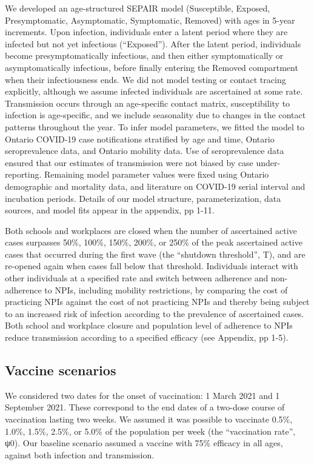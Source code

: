 We developed an age-structured SEPAIR model (Susceptible, Exposed, Presymptomatic, Asymptomatic, Symptomatic, Removed) with ages in 5-year increments. Upon infection, individuals enter a latent period where they are infected but not yet infectious (“Exposed”).  After the latent period, individuals become presymptomatically infectious, and then either symptomatically or asymptomatically infectious, before finally entering the Removed compartment when their infectiousness ends. We did not model testing or contact tracing explicitly, although we assume infected individuals are ascertained at some rate. Transmission occurs through an age-specific contact matrix, susceptibility to infection is age-specific, and we include seasonality due to changes in the contact patterns throughout the year.  To infer model parameters, we fitted the model to Ontario COVID-19 case notifications stratified by age and time, Ontario seroprevalence data, and Ontario mobility data.  Use of seroprevalence data ensured that our estimates of transmission were not biased by case under-reporting. Remaining model parameter values were fixed using Ontario demographic and mortality data, and literature on COVID-19 serial interval and incubation periods.  Details of our model structure, parameterization, data sources, and model fits appear in the appendix, pp 1-11. 

Both schools and workplaces are closed when the number of ascertained active cases surpasses 50\%, 100\%, 150\%, 200\%, or 250\% of the peak ascertained active cases that occurred during the first wave (the “shutdown threshold”, T), and are re-opened again when cases fall below that threshold. Individuals interact with other individuals at a specified rate and switch between adherence and non-adherence to NPIs, including mobility restrictions, by comparing the cost of practicing NPIs against the cost of not practicing NPIs and thereby being subject to an increased risk of infection according to the prevalence of ascertained cases.  Both school and workplace closure and population level of adherence to NPIs reduce transmission according to a specified efficacy (see Appendix, pp 1-5). 

\subsection{Vaccine scenarios} 

We considered two dates for the onset of vaccination: 1 March 2021 and 1 September 2021. These correspond to the end dates of a two-dose course of vaccination lasting two weeks. We assumed it was possible to vaccinate 0.5\%, 1.0\%, 1.5\%, 2.5\%, or 5.0\% of the population per week (the “vaccination rate”, ψ0).  Our baseline scenario assumed a vaccine with 75\% efficacy in all ages, against both infection and transmission.  

